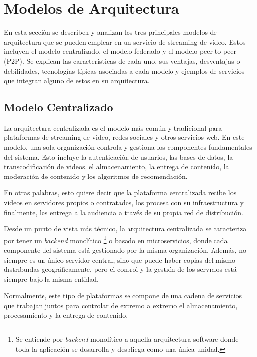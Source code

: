 \section{Modelos de Arquitectura}


En esta sección se describen y analizan los tres principales modelos de arquitectura que se pueden emplear en un servicio de streaming de video. Estos incluyen el modelo centralizado, el modelo federado y el modelo peer-to-peer (P2P). Se explican las características de cada uno, sus ventajas, desventajas o debilidades, tecnologías típicas asociadas a cada modelo y ejemplos de servicios que integran alguno de estos en su arquitectura. 

\subsection{Modelo Centralizado}

\label{2.3.1}


La arquitectura centralizada es el modelo más común y tradicional para plataformas de streaming de video, redes sociales y otros servicios web. En este modelo, una sola organización controla y gestiona los componentes fundamentales del sistema. Esto incluye la autenticación de usuarios, las bases de datos, la transcodificación de videos, el almacenamiento, la entrega de contenido, la moderación de contenido y los algoritmos de recomendación. 

En otras palabras, esto quiere decir que la plataforma centralizada recibe los videos en servidores propios o contratados, los procesa con su infraestructura y finalmente, los entrega a la audiencia a través de su propia red de distribución. 

Desde un punto de vista más técnico, la arquitectura centralizada se caracteriza por tener un \textit{backend} monolítico \footnote{Se entiende por \textit{backend} monolítico a aquella arquitectura software donde toda la aplicación se desarrolla y despliega como una única unidad.} o basado en microservicios, donde cada componente del sistema está gestionado por la misma organización.  Además, no siempre es un único servidor central, sino que puede haber copias del mismo distribuidas geográficamente, pero el control y la gestión de los servicios está siempre bajo la misma entidad.

Normalmente, este tipo de plataformas se compone de una cadena de servicios que trabajan juntos para controlar de extremo a extremo el almacenamiento, procesamiento y la entrega de contenido. 


